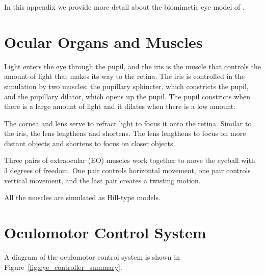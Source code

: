 \documentclass [MS] {UCLAthesis}
\begin{document}
In this appendix we provide more detail about the biomimetic eye model of \citet{Arjun}.

\section{Ocular Organs and Muscles}

Light enters the eye through the pupil, and the iris is the muscle that controls the amount of light that makes its way to the retina. The iris is controlled in the simulation by two muscles: the pupillary sphincter, which constricts the pupil, and the pupillary dilator, which opens up the pupil. The pupil constricts when there is a large amount of light and it dilates when there is a low amount. 

The cornea and lens serve to refract light to focus it onto the retina. Similar to the iris, the lens lengthens and shortens. The lens lengthens to focus on more distant objects and shortens to focus on closer objects. 

Three pairs of extraocular (EO) muscles work together to move the eyeball with 3 degrees of freedom. One pair controls horizontal movement, one pair controls vertical movement, and the last pair creates a twisting motion.

All the muscles are simulated as Hill-type models.

\section{Oculomotor Control System}

A diagram of the oculomotor control system is shown in Figure~\ref{fig:eye_controller_summary}.
\end{document}
